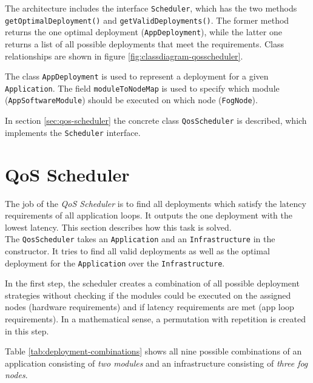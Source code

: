 The architecture includes the interface \texttt{Scheduler}, which has the two methods \texttt{getOptimalDeployment()} and \texttt{getValidDeployments()}. The former method returns the one optimal deployment (\texttt{AppDeployment}), while the latter one returns a list of all possible deployments that meet the requirements. Class relationships are shown in figure \ref{fig:classdiagram-qosscheduler}.

The class \texttt{AppDeployment} is used to represent a deployment for a given \texttt{Application}. The field \texttt{moduleToNodeMap} is used to specify which module (\texttt{AppSoftwareModule}) should be executed on which node (\texttt{FogNode}).

In section \ref{sec:qos-scheduler} the concrete class \texttt{QosScheduler} is described, which implements the \texttt{Scheduler} interface.



\section{QoS Scheduler\label{sec:qos-scheduler}}
The job of the \textit{QoS Scheduler} is to find all deployments which satisfy the latency requirements of all application loops.
It outputs the one deployment with the lowest latency.
This section describes how this task is solved.\\

The \texttt{QosScheduler} takes an \texttt{Application} and an \texttt{Infrastructure} in the constructor.
It tries to find all valid deployments as well as the optimal deployment for the \texttt{Application} over the \texttt{Infrastructure}.

In the first step, the scheduler creates a combination of all possible deployment strategies without checking if the modules could be executed on the assigned nodes (hardware requirements) and if latency requirements are met (app loop requirements).
In a mathematical sense, a permutation with repetition is created in this step.

Table \ref{tab:deployment-combinations} shows all nine possible combinations of an application consisting of \textit{two modules} and an infrastructure consisting of \textit{three fog nodes}.


